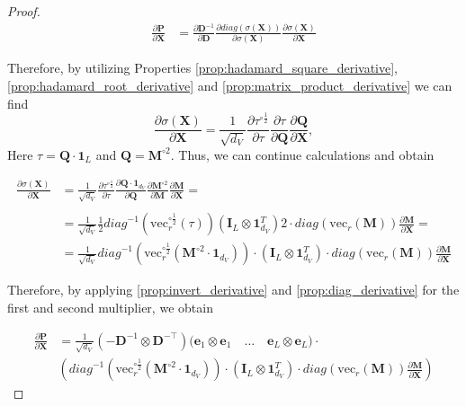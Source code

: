 \documentclass{article}
\begin{document}
\begin{proof}
\begin{align*}
    \frac{\partial \mathbf{P}}{\partial \mathbf{X}} &= \frac{\partial \mathbf{D}^{-1}}{\partial \mathbf{D}} \frac{\partial\textit{diag}(\sigma(\mathbf{X}))}{\partial \sigma(\mathbf{X})} \frac{\partial \sigma(\mathbf{X})}{\partial \mathbf{X}}
\end{align*}

Therefore, by utilizing Properties \ref{prop:hadamard_square_derivative}, \ref{prop:hadamard_root_derivative} and \ref{prop:matrix_product_derivative} we can find
\begin{equation*}
    \frac{\partial \sigma(\mathbf{X})}{\partial \mathbf{X}} = \frac{1}{\sqrt{d_V}} \frac{\partial \tau^{\circ \frac{1}{2}}}{\partial \tau} \frac{\partial \tau}{\partial \mathbf{Q}} \frac{\partial \mathbf{Q}}{\partial {\mathbf{X}}},
\end{equation*}
Here $\tau = \mathbf{Q}\cdot\mathbf{1}_L$ and $\mathbf{Q} = \mathbf{M}^{\circ{2}}$. Thus, we can continue calculations and obtain

\begin{align*}
    \frac{\partial \sigma(\mathbf{X})}{\partial \mathbf{X}} &= \frac{1}{\sqrt{d_V}} \frac{\partial \tau^{\circ \frac{1}{2}}}{\partial \tau} \frac{\partial \mathbf{Q}\cdot\mathbf{1}_{d_V}}{\partial \mathbf{Q}} \frac{\partial \mathbf{M}^{\circ{2}}}{\partial \mathbf{M}} \frac{\partial \mathbf{M}}{\partial \mathbf{X}} = \\
    \\ &= \frac{1}{\sqrt{d_V}} \frac{1}{2} \textit{diag}^{-1}(\mathrm{vec}_r^{\circ \frac{1}{2}}(\tau)) (\mathbf{I}_L \otimes \mathbf{1}^T_{d_V}) 2\cdot \textit{diag}(\mathrm{vec}_r (\mathbf{M}))\frac{\partial \mathbf{M}}{\partial \mathbf{X}} = \\
    &= \frac{1}{\sqrt{d_V}}\textit{diag}^{-1}(\mathrm{vec}_r^{\circ \frac{1}{2}}(\mathbf{M}^{\circ{2}}\cdot\mathbf{1}_{d_V}))\cdot (\mathbf{I}_L \otimes \mathbf{1}^T_{d_V})\cdot \textit{diag}(\mathrm{vec}_r (\mathbf{M})) \frac{\partial \mathbf{M}}{\partial \mathbf{X}}
\end{align*}

Therefore, by applying \ref{prop:invert_derivative} and \ref{prop:diag_derivative} for the first and second multiplier, we obtain

\begin{align*}
    \frac{\partial \mathbf{P}}{\partial \mathbf{X}} &= \frac{1}{\sqrt{d_V}}\left(-\mathbf{D}^{-1} \otimes \mathbf{D}^{-\top} \right) \Big(\mathbf{e}_1 \otimes \mathbf{e}_1 \quad \dots  \quad \mathbf{e}_L \otimes \mathbf{e}_L\Big) \cdot \\
    &\left(\textit{diag}^{-1}(\mathrm{vec}_r^{\circ \frac{1}{2}}(\mathbf{M}^{\circ{2}}\cdot\mathbf{1}_{d_V}))\cdot (\mathbf{I}_L \otimes \mathbf{1}^T_{d_V})\cdot \textit{diag}(\mathrm{vec}_r (\mathbf{M}))\frac{\partial \mathbf{M}}{\partial \mathbf{X}}\right)
\end{align*}


\end{proof}
\end{document}
